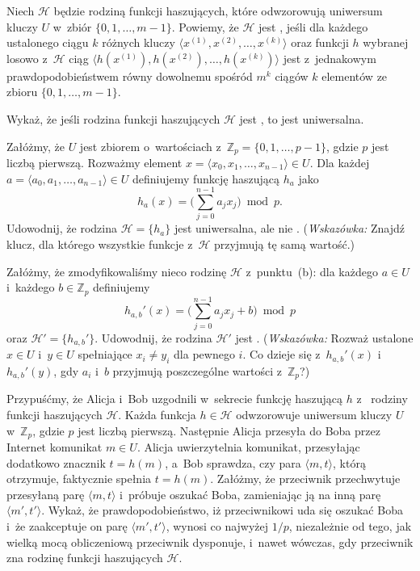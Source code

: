 \noindent Niech $\mathcal{H}$ będzie rodziną funkcji haszujących, które odwzorowują uniwersum kluczy $U$ w~zbiór $\{0,1,\dots,m-1\}$. Powiemy, że $\mathcal{H}$ jest \textbf{}, jeśli dla każdego ustalonego ciągu $k$ różnych kluczy $\langle x^{(1)},x^{(2)},\dots,x^{(k)}\rangle$ oraz funkcji $h$ wybranej losowo z~$\mathcal{H}$ ciąg $\langle h(x^{(1)}),h(x^{(2)}),\dots,h(x^{(k)})\rangle$ jest z~jednakowym prawdopodobieństwem równy dowolnemu spośród $m^k$ ciągów $k$ elementów ze zbioru $\{0,1,\dots,m-1\}$.
\begin{description}
	\setlength{}
	\item[{\sffamily\bfseries(a)}] Wykaż, że jeśli rodzina funkcji haszujących $\mathcal{H}$ jest , to jest uniwersalna.
	\item[{\sffamily\bfseries(b)}] Załóżmy, że $U$ jest zbiorem  o~wartościach z~$\mathbb{Z}_p=\{0,1,\dots,p-1\}$, gdzie $p$ jest liczbą pierwszą. Rozważmy element $x=\langle x_0,x_1,\dots,x_{n-1}\rangle\in U$. Dla każdej  $a=\langle a_0,a_1,\dots,a_{n-1}\rangle\in U$ definiujemy funkcję haszującą $h_a$ jako
	\[
		h_a(x) = \biggl(\sum_{j=0}^{n-1}a_jx_j\biggr)\bmod p.
	\]
	Udowodnij, że rodzina $\mathcal{H}=\{h_a\}$ jest uniwersalna, ale nie . (\!\emph{Wskazówka:} Znajdź klucz, dla którego wszystkie funkcje z~$\mathcal{H}$ przyjmują tę samą wartość.)
	\item[{\sffamily\bfseries(c)}] Załóżmy, że zmodyfikowaliśmy nieco rodzinę $\mathcal{H}$ z~punktu~(b): dla każdego $a\in U$ i~każdego $b\in\mathbb{Z}_p$ definiujemy
	\[
		h_{a,b}'(x) = \biggl(\sum_{j=0}^{n-1}a_jx_j+b\biggr)\bmod p
	\]
	oraz $\mathcal{H}'=\{h_{a,b}'\}$. Udowodnij, że rodzina $\mathcal{H}'$ jest . (\!\emph{Wskazówka:} Rozważ ustalone $x\in U$ i~$y\in U$ spełniające $x_i\ne y_i$ dla pewnego $i$. Co dzieje się z~$h_{a,b}'(x)$ i~$h_{a,b}'(y)$, gdy $a_i$ i~$b$ przyjmują poszczególne wartości z~$\mathbb{Z}_p$?)
	\item[{\sffamily\bfseries(d)}] Przypuśćmy, że Alicja i~Bob uzgodnili w~sekrecie funkcję haszującą $h$ z~ rodziny funkcji haszujących $\mathcal{H}$. Każda funkcja $h\in\mathcal{H}$ odwzorowuje uniwersum kluczy $U$ w~$\mathbb{Z}_p$, gdzie $p$ jest liczbą pierwszą. Następnie Alicja przesyła do Boba przez Internet komunikat $m\in U$. Alicja uwierzytelnia komunikat, przesyłając dodatkowo znacznik $t=h(m)$, a~Bob sprawdza, czy para $\langle m,t\rangle$, którą otrzymuje, faktycznie spełnia $t=h(m)$. Załóżmy, że przeciwnik przechwytuje przesyłaną parę $\langle m,t\rangle$ i~próbuje oszukać Boba, zamieniając ją na inną parę $\langle m',t'\rangle$. Wykaż, że prawdopodobieństwo, iż przeciwnikowi uda się oszukać Boba i~że zaakceptuje on parę $\langle m',t'\rangle$, wynosi co najwyżej $1/p$, niezależnie od tego, jak wielką mocą obliczeniową przeciwnik dysponuje, i~nawet wówczas, gdy przeciwnik zna rodzinę funkcji haszujących $\mathcal{H}$.
\end{description}

